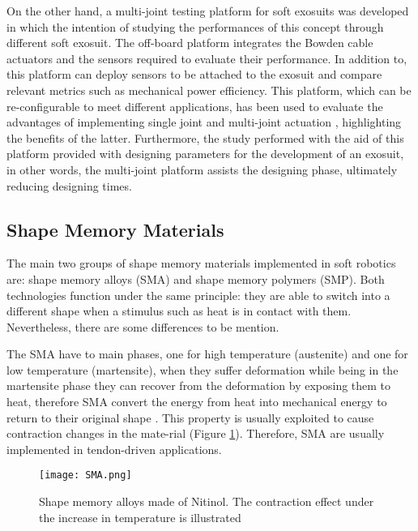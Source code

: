 On the other hand, a multi-joint testing platform for soft exosuits was developed in \cite{Ding2014} which the intention of studying the performances of this concept through different soft exosuit. The off-board platform integrates the Bowden cable actuators and the sensors required to evaluate their performance. In addition to, this platform can deploy sensors to be attached to the exosuit and compare relevant metrics such as mechanical power efficiency. This platform, which can be re-configurable to meet different applications, has been used to evaluate the advantages of implementing single joint and multi-joint actuation \cite{Ding2016}, highlighting the benefits of the latter. Furthermore, the study performed with the aid of this platform provided with designing parameters for the development of an exosuit, in other words, the multi-joint platform assists the designing phase, ultimately reducing designing times.

\subsection{Shape Memory Materials}

The main two groups of shape memory materials implemented in soft robotics are: shape memory alloys (SMA) and shape memory polymers (SMP). Both technologies function under the same principle: they are able to switch into a different shape when a stimulus such as heat is in contact with them. Nevertheless, there are some differences to be mention.

The SMA have to main phases, one for high temperature (austenite) and one for low temperature (martensite), when they suffer deformation while being in the martensite phase they can recover from the deformation by exposing them to heat, therefore SMA convert the energy from heat into mechanical energy to return to their original shape \cite{ImagesScientificInstrument2016}. This property is usually exploited to cause contraction changes in the mate-rial (Figure \ref{fig:SMA}). Therefore, SMA are usually implemented in tendon-driven applications.

\begin{figure}[hb!]
    \centering
    \texttt{[image: SMA.png]}
    \caption{Shape memory alloys made of Nitinol. The contraction effect under the increase in temperature is illustrated \cite{ImagesScientificInstrument2016} }
    \label{fig:SMA}
\end{figure}

